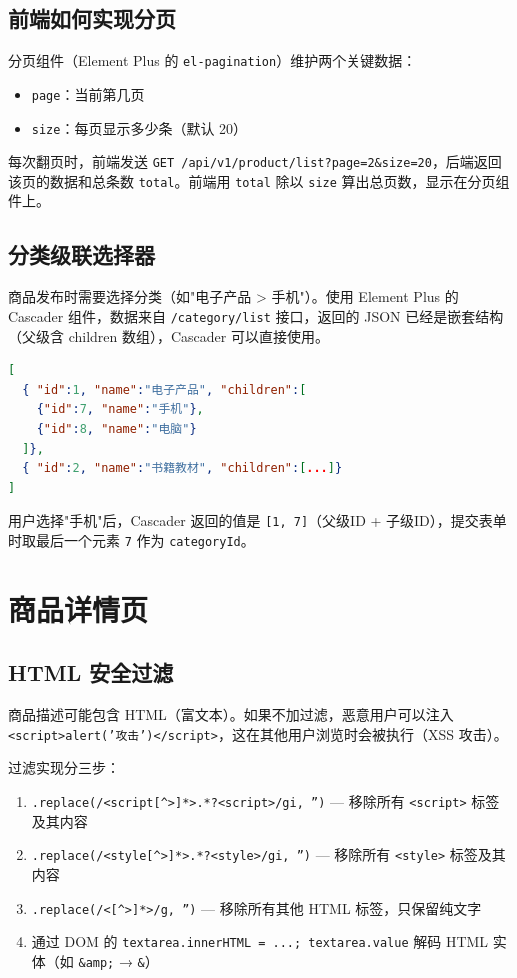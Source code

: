 \documentclass[12pt,a4paper]{ctexart}
\begin{document}
\subsection{前端如何实现分页}

分页组件（Element Plus 的 \texttt{el-pagination}）维护两个关键数据：
\begin{itemize}
  \item \texttt{page}：当前第几页
  \item \texttt{size}：每页显示多少条（默认 20）
\end{itemize}

每次翻页时，前端发送 \texttt{GET /api/v1/product/list?page=2\&size=20}，后端返回该页的数据和总条数 \texttt{total}。前端用 \texttt{total} 除以 \texttt{size} 算出总页数，显示在分页组件上。

\subsection{分类级联选择器}

商品发布时需要选择分类（如"电子产品 > 手机"）。使用 Element Plus 的 Cascader 组件，数据来自 \texttt{/category/list} 接口，返回的 JSON 已经是嵌套结构（父级含 children 数组），Cascader 可以直接使用。

\begin{lstlisting}[language=JSON]
[
  { "id":1, "name":"电子产品", "children":[
    {"id":7, "name":"手机"},
    {"id":8, "name":"电脑"}
  ]},
  { "id":2, "name":"书籍教材", "children":[...]}
]
\end{lstlisting}

用户选择"手机"后，Cascader 返回的值是 \texttt{[1, 7]}（父级ID + 子级ID），提交表单时取最后一个元素 \texttt{7} 作为 \texttt{categoryId}。

\section{商品详情页}

\subsection{HTML 安全过滤}

商品描述可能包含 HTML（富文本）。如果不加过滤，恶意用户可以注入 \texttt{<script>alert('攻击')</script>}，这在其他用户浏览时会被执行（XSS 攻击）。

过滤实现分三步：
\begin{enumerate}
  \item \texttt{.replace(/<script[^>]*>.*?<\/script>/gi, '')} — 移除所有 \texttt{<script>} 标签及其内容
  \item \texttt{.replace(/<style[^>]*>.*?<\/style>/gi, '')} — 移除所有 \texttt{<style>} 标签及其内容
  \item \texttt{.replace(/<[^>]*>/g, '')} — 移除所有其他 HTML 标签，只保留纯文字
  \item 通过 DOM 的 \texttt{textarea.innerHTML = ...; textarea.value} 解码 HTML 实体（如 \texttt{\&amp;} → \texttt{\&}）
\end{enumerate}
\end{document}
